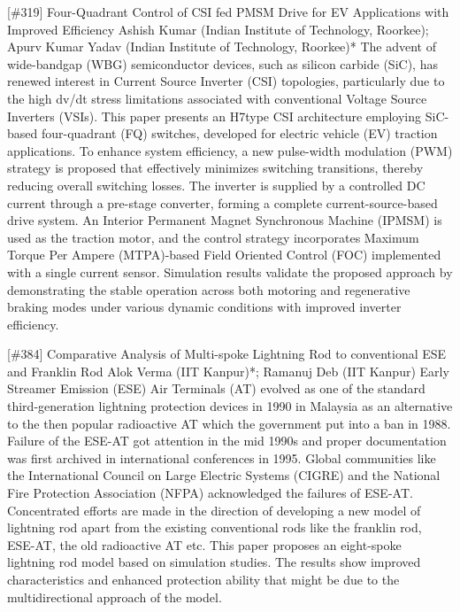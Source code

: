 {} \begin{abstract_online} {[\#319] Four-Quadrant Control of CSI fed PMSM Drive for  EV Applications with Improved Efficiency} {} {Ashish Kumar (Indian Institute of Technology, Roorkee); Apurv Kumar Yadav (Indian Institute of Technology, Roorkee)*} {} The advent of wide-bandgap (WBG) semiconductor devices, such as silicon carbide (SiC), has renewed interest in Current Source Inverter (CSI) topologies, particularly due to the high dv/dt stress limitations associated with conventional Voltage Source Inverters (VSIs). This paper presents an H7type CSI architecture employing SiC-based four-quadrant (FQ) switches, developed for electric vehicle (EV) traction applications.  To enhance system efficiency, a new pulse-width modulation  (PWM) strategy is proposed that effectively minimizes switching transitions, thereby reducing overall switching losses. The inverter is supplied by a controlled DC current through a pre-stage converter, forming a complete current-source-based drive system. An Interior Permanent Magnet Synchronous Machine (IPMSM) is used as the traction motor, and the control strategy incorporates Maximum Torque Per Ampere (MTPA)-based Field Oriented Control (FOC) implemented with a single current sensor. Simulation results validate the proposed approach by demonstrating the stable operation across both motoring and regenerative braking modes under various dynamic conditions with improved inverter efficiency. \end{abstract_online} 
{} \begin{abstract_online} {[\#384] Comparative Analysis of Multi-spoke Lightning Rod to conventional ESE and Franklin Rod} {} {Alok Verma (IIT Kanpur)*; Ramanuj Deb (IIT Kanpur)} {} Early Streamer Emission (ESE) Air Terminals (AT) evolved as one of the standard third-generation lightning protection devices in 1990 in Malaysia as an alternative to the then popular radioactive AT which the government put into a ban in 1988. Failure of the ESE-AT got attention in the mid 1990s and proper documentation was first archived in international conferences in 1995. Global communities like the International Council on Large Electric Systems (CIGRE) and the National Fire Protection Association (NFPA) acknowledged the failures of ESE-AT. Concentrated efforts are made in the direction of developing a new model of lightning rod apart from the existing conventional rods like the franklin rod, ESE-AT, the old radioactive AT etc. This paper proposes an eight-spoke lightning rod model based on simulation studies. The results show improved characteristics and enhanced protection ability that might be due to the multidirectional approach of the model. \end{abstract_online} 
